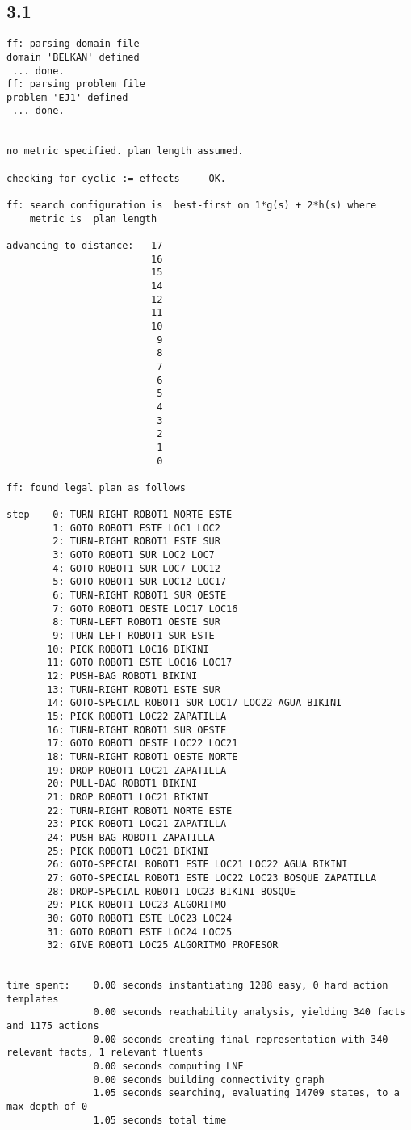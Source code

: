 \documentclass{article}
\begin{document}
\subsection*{3.1}
\begin{lstlisting}
ff: parsing domain file
domain 'BELKAN' defined
 ... done.
ff: parsing problem file
problem 'EJ1' defined
 ... done.


no metric specified. plan length assumed.

checking for cyclic := effects --- OK.

ff: search configuration is  best-first on 1*g(s) + 2*h(s) where
    metric is  plan length

advancing to distance:   17
                         16
                         15
                         14
                         12
                         11
                         10
                          9
                          8
                          7
                          6
                          5
                          4
                          3
                          2
                          1
                          0

ff: found legal plan as follows

step    0: TURN-RIGHT ROBOT1 NORTE ESTE
        1: GOTO ROBOT1 ESTE LOC1 LOC2
        2: TURN-RIGHT ROBOT1 ESTE SUR
        3: GOTO ROBOT1 SUR LOC2 LOC7
        4: GOTO ROBOT1 SUR LOC7 LOC12
        5: GOTO ROBOT1 SUR LOC12 LOC17
        6: TURN-RIGHT ROBOT1 SUR OESTE
        7: GOTO ROBOT1 OESTE LOC17 LOC16
        8: TURN-LEFT ROBOT1 OESTE SUR
        9: TURN-LEFT ROBOT1 SUR ESTE
       10: PICK ROBOT1 LOC16 BIKINI
       11: GOTO ROBOT1 ESTE LOC16 LOC17
       12: PUSH-BAG ROBOT1 BIKINI
       13: TURN-RIGHT ROBOT1 ESTE SUR
       14: GOTO-SPECIAL ROBOT1 SUR LOC17 LOC22 AGUA BIKINI
       15: PICK ROBOT1 LOC22 ZAPATILLA
       16: TURN-RIGHT ROBOT1 SUR OESTE
       17: GOTO ROBOT1 OESTE LOC22 LOC21
       18: TURN-RIGHT ROBOT1 OESTE NORTE
       19: DROP ROBOT1 LOC21 ZAPATILLA
       20: PULL-BAG ROBOT1 BIKINI
       21: DROP ROBOT1 LOC21 BIKINI
       22: TURN-RIGHT ROBOT1 NORTE ESTE
       23: PICK ROBOT1 LOC21 ZAPATILLA
       24: PUSH-BAG ROBOT1 ZAPATILLA
       25: PICK ROBOT1 LOC21 BIKINI
       26: GOTO-SPECIAL ROBOT1 ESTE LOC21 LOC22 AGUA BIKINI
       27: GOTO-SPECIAL ROBOT1 ESTE LOC22 LOC23 BOSQUE ZAPATILLA
       28: DROP-SPECIAL ROBOT1 LOC23 BIKINI BOSQUE
       29: PICK ROBOT1 LOC23 ALGORITMO
       30: GOTO ROBOT1 ESTE LOC23 LOC24
       31: GOTO ROBOT1 ESTE LOC24 LOC25
       32: GIVE ROBOT1 LOC25 ALGORITMO PROFESOR


time spent:    0.00 seconds instantiating 1288 easy, 0 hard action templates
               0.00 seconds reachability analysis, yielding 340 facts and 1175 actions
               0.00 seconds creating final representation with 340 relevant facts, 1 relevant fluents
               0.00 seconds computing LNF
               0.00 seconds building connectivity graph
               1.05 seconds searching, evaluating 14709 states, to a max depth of 0
               1.05 seconds total time
\end{lstlisting}
\end{document}
